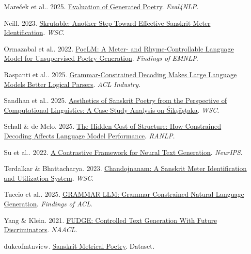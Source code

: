 \begin{list}{}{\setlength{\leftmargin}{1em}\setlength{\itemindent}{-1em}\setlength{\itemsep}{4pt}}
\item Mareček et al.. 2025. \href{https://aclanthology.org/2025.eval4nlp-1.9/}{Evaluation of Generated Poetry}. \textit{Eval4NLP}.
\item Neill. 2023. \href{https://aclanthology.org/2023.wsc-csdh.7/}{Skrutable: Another Step Toward Effective Sanskrit Meter Identification}. \textit{WSC}.
\item Ormazabal et al.. 2022. \href{https://aclanthology.org/2022.findings-emnlp.268/}{PoeLM: A Meter- and Rhyme-Controllable Language Model for Unsupervised Poetry Generation}. \textit{Findings of EMNLP}.
\item Raspanti et al.. 2025. \href{https://aclanthology.org/2025.acl-industry.34/}{Grammar-Constrained Decoding Makes Large Language Models Better Logical Parsers}. \textit{ACL Industry}.
\item Sandhan et al.. 2025. \href{https://aclanthology.org/2025.wsc-csdh.2/}{Aesthetics of Sanskrit Poetry from the Perspective of Computational Linguistics: A Case Study Analysis on Śikṣāṣṭaka}. \textit{WSC}.
\item Schall \& de Melo. 2025. \href{https://aclanthology.org/2025.ranlp-1.124/}{The Hidden Cost of Structure: How Constrained Decoding Affects Language Model Performance}. \textit{RANLP}.
\item Su et al.. 2022. \href{https://proceedings.neurips.cc/paper_files/paper/2022/hash/871cae8f599cb8bbfcb0f58fe1af95ad-Abstract-Conference.html}{A Contrastive Framework for Neural Text Generation}. \textit{NeurIPS}.
\item Terdalkar \& Bhattacharya. 2023. \href{https://aclanthology.org/2023.wsc-csdh.8/}{Chandojnanam: A Sanskrit Meter Identification and Utilization System}. \textit{WSC}.
\item Tuccio et al.. 2025. \href{https://aclanthology.org/2025.findings-acl.177/}{GRAMMAR-LLM: Grammar-Constrained Natural Language Generation}. \textit{Findings of ACL}.
\item Yang \& Klein. 2021. \href{https://aclanthology.org/2021.naacl-main.276/}{FUDGE: Controlled Text Generation With Future Discriminators}. \textit{NAACL}.
\item dukeofmtnview. \href{https://huggingface.co/datasets/dukeofmtnview/sanskrit-metrical-poetry}{Sanskrit Metrical Poetry}. Dataset.
\end{list}
